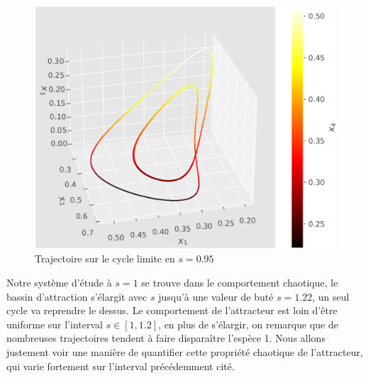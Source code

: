 \documentclass{wsdcr}
\begin{document}
\begin{figure}
    \centering
    \includegraphics[width=\linewidth]{fig/lv4_cl4.png}
    \caption{Trajectoire sur le cycle limite en $s=0.95$}
    \label{fig:cl4}
\end{figure}
Notre système d'étude à $s=1$ se trouve dans le comportement chaotique, le bassin d'attraction s'élargit avec $s$ jusqu'à une valeur de buté $s=1.22$, un seul cycle va reprendre le dessus. Le comportement de l'attracteur est loin d'être uniforme sur l'interval $s \in [1,1.2]$, en     plus de s'élargir, on remarque que de nombreuses trajectoires tendent à faire disparaître l'espèce 1. Nous allons justement voir une manière de quantifier cette propriété chaotique de l'attracteur, qui varie fortement sur l'interval précédemment cité.
\end{document}
